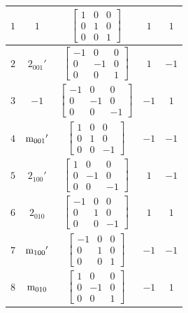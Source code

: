 \documentclass[fleqn,8pt]{jsarticle}
\begin{document}
\begin{longtable}{ccccc}
$ 1 $ & $ 1 $ & $ \begin{bmatrix} 1 & 0 & 0 \\ 0 & 1 & 0 \\ 0 & 0 & 1 \end{bmatrix} $ & $ 1 $ & $ 1 $ \\ \hline
$ 2 $ & $ 2{}_{001}{}' $ & $ \begin{bmatrix} -1 & 0 & 0 \\ 0 & -1 & 0 \\ 0 & 0 & 1 \end{bmatrix} $ & $ 1 $ & $ -1 $ \\ \hline
$ 3 $ & $ -1 $ & $ \begin{bmatrix} -1 & 0 & 0 \\ 0 & -1 & 0 \\ 0 & 0 & -1 \end{bmatrix} $ & $ -1 $ & $ 1 $ \\ \hline
$ 4 $ & $ {\rm m}_{001}{}' $ & $ \begin{bmatrix} 1 & 0 & 0 \\ 0 & 1 & 0 \\ 0 & 0 & -1 \end{bmatrix} $ & $ -1 $ & $ -1 $ \\ \hline
$ 5 $ & $ 2{}_{100}{}' $ & $ \begin{bmatrix} 1 & 0 & 0 \\ 0 & -1 & 0 \\ 0 & 0 & -1 \end{bmatrix} $ & $ 1 $ & $ -1 $ \\ \hline
$ 6 $ & $ 2{}_{010} $ & $ \begin{bmatrix} -1 & 0 & 0 \\ 0 & 1 & 0 \\ 0 & 0 & -1 \end{bmatrix} $ & $ 1 $ & $ 1 $ \\ \hline
$ 7 $ & $ {\rm m}_{100}{}' $ & $ \begin{bmatrix} -1 & 0 & 0 \\ 0 & 1 & 0 \\ 0 & 0 & 1 \end{bmatrix} $ & $ -1 $ & $ -1 $ \\ \hline
$ 8 $ & $ {\rm m}_{010} $ & $ \begin{bmatrix} 1 & 0 & 0 \\ 0 & -1 & 0 \\ 0 & 0 & 1 \end{bmatrix} $ & $ -1 $ & $ 1 $ \\
\end{longtable}
\end{document}
